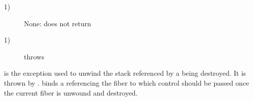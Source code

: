 \begin{description}
    \item[1)] None: \unwindfib does not return
\end{description}

\begin{description}
    \item[1)] throws \unwindex
\end{description}



is the exception used to unwind the stack referenced by a \fiber being destroyed.
It is thrown by \unwindfib. \unwindex binds a \fiber referencing the fiber to
which control should be passed once the current fiber is unwound and destroyed.
